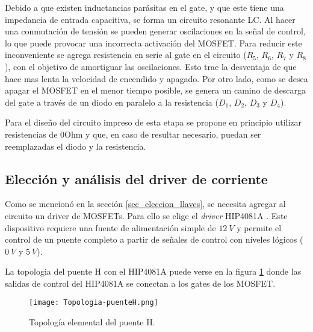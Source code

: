
Debido a que existen inductancias parásitas en el gate, y que este tiene una impedancia de entrada capacitiva, se forma un circuito resonante LC. Al hacer una conmutación de tensión se pueden generar oscilaciones en la señal de control, lo que puede provocar una incorrecta activación del MOSFET. Para reducir este inconveniente se agrega resistencia en serie al gate en el circuito ($R_5$, $R_6$, $R_7$ y $R_8$), con el objetivo de amortiguar las oscilaciones. Esto trae la desventaja de que hace mas lenta la velocidad de encendido y apagado. Por otro lado, como se desea apagar el MOSFET en el menor tiempo posible, se genera un camino de descarga del gate a través de un diodo en paralelo a la resistencia ($D_1$, $D_2$, $D_3$ y $D_4$).

Para el diseño del circuito impreso de esta etapa se propone en principio utilizar resistencias de 0Ohm y que, en caso de resultar necesario, puedan ser reemplazadas el diodo y la resistencia. 



\subsection{Elección y análisis del driver de corriente}

Como se mencionó en la sección \ref{sec_eleccion_llaves}, se necesita agregar al circuito un driver de MOSFETs. Para ello se elige el \textsl{driver} HIP4081A \cite{HIP4081A_FN3659}. Este dispositivo requiere una fuente de alimentación simple de $12\:V$ y permite el control de un puente completo a partir de señales de control con niveles lógicos ($0\:V$ y $5\:V$). 

La topologia del puente H con el HIP4081A puede verse en la figura \ref{fig:img_topologia-puenteH} donde las salidas de control del HIP4081A se conectan a los gates de los MOSFET.

\begin{figure}[H]
	\centering
	\texttt{[image: Topologia-puenteH.png]}
	\caption{Topología elemental del puente H.}
	\label{fig:img_topologia-puenteH}
\end{figure}

